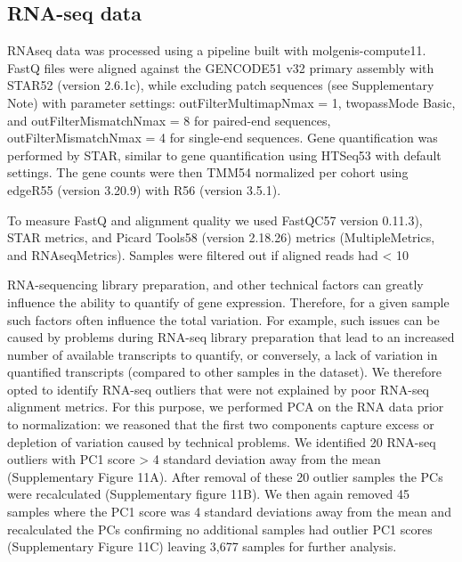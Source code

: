 \subsection{RNA-seq data}
RNAseq data was processed using a pipeline built with molgenis-compute11. FastQ files were aligned against the GENCODE51 v32 primary assembly with STAR52 (version 2.6.1c), while excluding patch sequences (see Supplementary Note) with parameter settings: outFilterMultimapNmax = 1, twopassMode Basic, and outFilterMismatchNmax = 8 for paired-end sequences, outFilterMismatchNmax = 4 for single-end sequences. Gene quantification was performed by STAR, similar to gene quantification using HTSeq53 with default settings. The gene counts were then TMM54 normalized per cohort using edgeR55 (version 3.20.9) with R56 (version 3.5.1). 



To measure FastQ and alignment quality we used FastQC57 version 0.11.3), STAR metrics, and Picard Tools58 (version 2.18.26) metrics (MultipleMetrics, and RNAseqMetrics). Samples were filtered out if aligned reads had < 10%



RNA-sequencing library preparation, and other technical factors can greatly influence the ability to quantify of gene expression. Therefore, for a given sample such factors often influence the total variation. For example, such issues can be caused by problems during RNA-seq library preparation that lead to an increased number of available transcripts to quantify, or conversely, a lack of variation in quantified transcripts (compared to other samples in the dataset). We therefore opted to identify RNA-seq outliers that were not explained by poor RNA-seq alignment metrics. For this purpose, we performed PCA on the RNA data prior to normalization: we reasoned that the first two components capture excess or depletion of variation caused by technical problems. We identified 20 RNA-seq outliers with PC1 score > 4 standard deviation away from the mean (Supplementary Figure 11A). After removal of these 20 outlier samples the PCs were recalculated (Supplementary figure 11B). We then again removed 45 samples where the PC1 score was 4 standard deviations away from the mean and recalculated the PCs confirming no additional samples had outlier PC1 scores (Supplementary Figure 11C) leaving 3,677 samples for further analysis. 



